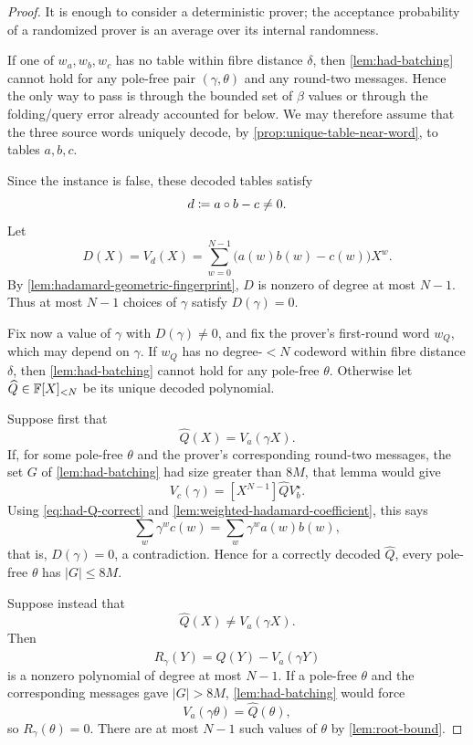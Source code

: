 \begin{proof}
It is enough to consider a deterministic prover; the acceptance probability of a randomized prover is an average over its internal randomness.

If one of $w_a,w_b,w_c$ has no table within fibre distance $\delta$, then \cref{lem:had-batching} cannot hold for any pole-free pair $(\gamma,\theta)$ and any round-two messages.  Hence the only way to pass is through the bounded set of $\beta$ values or through the folding/query error already accounted for below.  We may therefore assume that the three source words uniquely decode, by \cref{prop:unique-table-near-word}, to tables $a,b,c$.

Since the instance is false, these decoded tables satisfy
\[
  d\coloneqq a\circ b-c\ne0.
\]
Let
\[
  D(X)=V_d(X)=\sum_{w=0}^{N-1}\bigl(a(w)b(w)-c(w)\bigr)X^w.
\]
By \cref{lem:hadamard-geometric-fingerprint}, $D$ is nonzero of degree at most $N-1$.  Thus at most $N-1$ choices of $\gamma$ satisfy $D(\gamma)=0$.

Fix now a value of $\gamma$ with $D(\gamma)\ne0$, and fix the prover's first-round word $w_Q$, which may depend on $\gamma$.  If $w_Q$ has no degree-$<N$ codeword within fibre distance $\delta$, then \cref{lem:had-batching} cannot hold for any pole-free $\theta$.  Otherwise let $\widehat Q\in\mathbb{F}[X]_{<N}$ be its unique decoded polynomial.

Suppose first that
\begin{equation}
  \widehat Q(X)=V_a(\gamma X).
  \label{eq:had-Q-correct}
\end{equation}
If, for some pole-free $\theta$ and the prover's corresponding round-two messages, the set $G$ of \cref{lem:had-batching} had size greater than $8M$, that lemma would give
\[
  V_c(\gamma)
  =[X^{N-1}]\widehat QV_b^{\star}.
\]
Using \eqref{eq:had-Q-correct} and \cref{lem:weighted-hadamard-coefficient}, this says
\[
  \sum_w\gamma^wc(w)
  =\sum_w\gamma^wa(w)b(w),
\]
that is, $D(\gamma)=0$, a contradiction.  Hence for a correctly decoded $\widehat Q$, every pole-free $\theta$ has $|G|\le8M$.

Suppose instead that
\[
  \widehat Q(X)\ne V_a(\gamma X).
\]
Then
\[
  R_\gamma(Y)=\widehat Q(Y)-V_a(\gamma Y)
\]
is a nonzero polynomial of degree at most $N-1$.  If a pole-free $\theta$ and the corresponding messages gave $|G|>8M$, \cref{lem:had-batching} would force
\[
  V_a(\gamma\theta)=\widehat Q(\theta),
\]
so $R_\gamma(\theta)=0$.  There are at most $N-1$ such values of $\theta$ by \cref{lem:root-bound}.


\end{proof}
